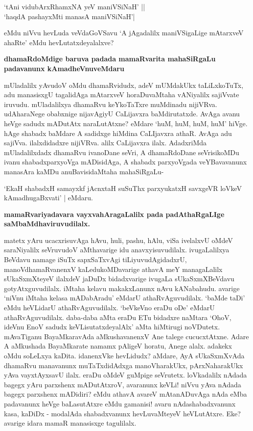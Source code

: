 \begin{shloka}
`tAni vidubArxRhamxNA yeV maniVSiNaH' ||\\
`haqdA pashayxMti manasA maniVSiNaH'|
\end{shloka}

eMdu niVvu hevLuda veVdaGoVSavu `A jAgadalilx maniVSigaLige mAtarxveV ahaRte' eMdu hevLutatxdeyalalxve?

{\bf dhamaRdoMdige baruva padada mamaRvarita mahaSiRgaLu padavanunx kAmadheVnuveMdaru}

mUladalilx yAvudoV oMdu dhamaRvidudx, adeV mUMdakUkx taLiLxkoTuTx, adu manasisxgU tagalidAga mAtarxveV horaDuvaMtaha vANiyalilx sajiVvate iruvudu. mUladalilxya dhamaRvu keYkoTaTxre muMdinadu nijiVRva. udAharaNege obabxnige nijavAgiyU CaLijavxra baMdirutatxde. AvAga avanu heVge sadudx mADutAtx naraLutAtxne? eMdare `huM, huM, huM, huM' hiVge. hAge shabadx baMdare A sadidxge hiMdina CaLIjavxra athaR. AvAga adu sajiVva. ilalxdidadxre nijiVRva. alilx CaLijavxra ilalx. AdadxriMda mUladalilxdadx dhamaRvu ivanoDane seVri, A dhamaRdoDane seVrisikoMDu ivanu shabadxparxyoVga mADisidAga, A shabadx parxyoVgada veYBavavanunx manasAra kaMDu anuBavisidaMtaha mahaSiRgaLu-

\begin{shloka}
`EkaH shabadxH samayxkf jAcnxtaH suSuThx parxyukatxH savxgeVR loVkeV kAmadhugaBxvati' | eMdaru.
\end{shloka}

{\bf mamaRvariyadavara vayxvahAragaLalilx pada padAthaRgaLIge saMbaMdhaviruvudilalx.}

matetx yAru ucacxrisuvAga hAvu, huli, pashu, hAlu, viSa ivelalxvU oMdeV saraNiyalilx seVruvudoV aMthavarige idu anavxyisuvudilalx. ivugaLalilxya BeVdavu namage iSuTx sapxSaTxvAgi tiLiyuvudAgidadxrU, manoVdhamaRvanenxV kaLedukoMDavarige athavA meY managaLalilx sUkaSxmXteyeV ilalxdeV jaDuDx bidadxvarige ivugaLa sUkaSxmXBeVdavu gotyAtxguvudilalx. iMtaha kelavu makakxLanunx nAvu kANabahudu. avarige `niVnu iMtaha kelasa mADabAradu' eMdarU athaRvAguvudilalx. `baMde taDi' eMdu heVLidarU athaRvAguvudilalx. `beVkeVno eraDu oDe' eMdarU athaRvAguvudilalx. daba-daba aMta eraDu ETu bidadxre naMtara `OhoV, ideVnu EnoV sadudx keVLisutatxdeyalAlx' aMta hiMtirugi noVDutetx. mAvaTiganu BayaMkaravAda aMkushavanenxV Ane talege cucucxtAtxne. Adare A aMkushada BayaMkarate namamx pAligeV horatu, Anege alalx. adakekx oMdu soLeLxya kaDita. idanenxVke hevLidudx? aMdare, AyA sUkaSxmXvAda dhamaRvu manavanunx muTaTxdidAdxga manoVharakUkx, pArxNaharakUkx yAva vayxtAyxsavU ilalx. eraDu oMdeV guMpige seVrutetx. loVkadalilx nAdada bagegx yAru parxshenx mADutAtxroV, avaranunx keVLi! niVvu yAva nAdada bagegx parxshenx mADidiri? eMdu athavA avareV mAtanADuvAga nAda eMba padavanunx heVge baLasutAtxre eMdu gamanisi! avaru nAdashabadxvanunx kasa, kaDiDx - modalAda shabadxvanunx hevLuvaMteyeV heVLutAtxre. Eke? avarige idara mamaR manasisxge tagulilalx.

